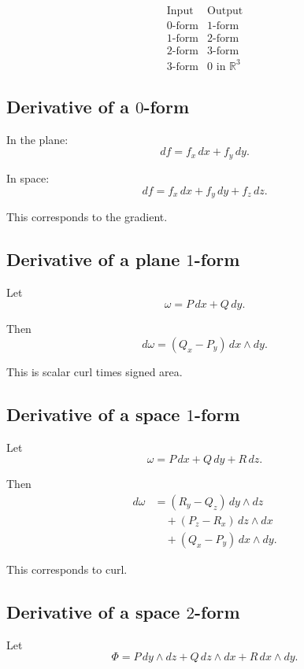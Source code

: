 \[
\begin{array}{c|c}
\text{Input} & \text{Output} \\ \hline
0\text{-form} & 1\text{-form}\\
1\text{-form} & 2\text{-form}\\
2\text{-form} & 3\text{-form}\\
3\text{-form} & 0\text{ in }\mathbb R^3
\end{array}
\]

\subsection*{Derivative of a \texorpdfstring{\(0\)}{0}-form}

In the plane:
\[
\boxed{
    df=f_x\,dx+f_y\,dy.
}
\]

In space:
\[
\boxed{
    df=f_x\,dx+f_y\,dy+f_z\,dz.
}
\]

This corresponds to the gradient.

\subsection*{Derivative of a plane \texorpdfstring{\(1\)}{1}-form}

Let
\[
    \omega=P\,dx+Q\,dy.
\]

Then
\[
\boxed{
    d\omega
    =
    (Q_x-P_y)\,dx\wedge dy.
}
\]

This is scalar curl times signed area.

\subsection*{Derivative of a space \texorpdfstring{\(1\)}{1}-form}

Let
\[
    \omega=P\,dx+Q\,dy+R\,dz.
\]

Then
\[
\boxed{
\begin{aligned}
d\omega
&=
(R_y-Q_z)\,dy\wedge dz\\
&\quad+
(P_z-R_x)\,dz\wedge dx\\
&\quad+
(Q_x-P_y)\,dx\wedge dy.
\end{aligned}
}
\]

This corresponds to curl.

\subsection*{Derivative of a space \texorpdfstring{\(2\)}{2}-form}

Let
\[
    \Phi=P\,dy\wedge dz+Q\,dz\wedge dx+R\,dx\wedge dy.
\]

